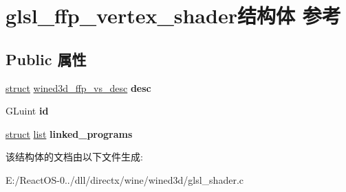 \hypertarget{structglsl__ffp__vertex__shader}{}\section{glsl\+\_\+ffp\+\_\+vertex\+\_\+shader结构体 参考}
\label{structglsl__ffp__vertex__shader}
\subsection*{Public 属性}
\begin{DoxyCompactItemize}
\item 
\mbox{\label{structglsl__ffp__vertex__shader_a1acfee8e76f7d7bd3add48bb664999bf}} 
\hyperlink{interfacestruct}{struct} \hyperlink{structwined3d__ffp__vs__desc}{wined3d\+\_\+ffp\+\_\+vs\+\_\+desc} {\bfseries desc}
\item 
\mbox{\label{structglsl__ffp__vertex__shader_a46215fb48ce18f2f6652d5cc8247cf46}} 
G\+Luint {\bfseries id}
\item 
\mbox{\label{structglsl__ffp__vertex__shader_a969fc8448bf0e2b306462734a610545d}} 
\hyperlink{interfacestruct}{struct} \hyperlink{classlist}{list} {\bfseries linked\+\_\+programs}
\end{DoxyCompactItemize}


该结构体的文档由以下文件生成\+:\begin{DoxyCompactItemize}
\item 
E\+:/\+React\+O\+S-\/0../dll/directx/wine/wined3d/glsl\+\_\+shader.\+c\end{DoxyCompactItemize}
